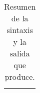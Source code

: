 \documentclass{article}
\begin{document}
\begin{table}[h!]
\begin{tabular}{| >{\centering\arraybackslash}m{3.5cm}
    |>{\centering\arraybackslash}m{9cm}|}
\begin{circuitikz}
                 \end{circuitikz}
                 \\ \hline
  \end{tabular}
  \caption{Resumen de la sintaxis y la salida que produce.}
  \label{}

\end{table}
\end{document}

